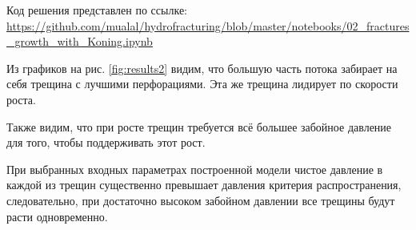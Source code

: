 Код решения представлен по ссылке: \url{https://github.com/mualal/hydrofracturing/blob/master/notebooks/02_fractures_growth_with_Koning.ipynb}

Из графиков на рис. \ref{fig:results2} видим, что большую часть потока забирает на себя трещина с лучшими перфорациями.
Эта же трещина лидирует по скорости роста.

Также видим, что при росте трещин требуется всё большее забойное давление для того, чтобы поддерживать этот рост.

При выбранных входных параметрах построенной модели чистое давление в каждой из трещин существенно превышает давления критерия распространения, следовательно, при достаточно высоком забойном давлении все трещины будут расти одновременно.
